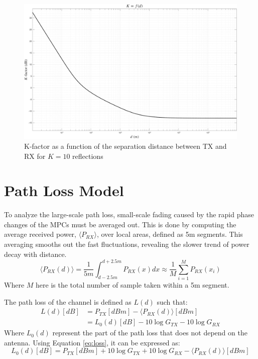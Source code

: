 \begin{figure}
	\centering
	\includegraphics[width=\linewidth]{content/4-images/k-factor}
	\caption{K-factor as a function of the separation distance between TX and RX for $K=10$ reflections}
	\label{fig:k-factor}
\end{figure}

\section{Path Loss Model}
To analyze the large-scale path loss, small-scale fading caused by the rapid phase changes of the MPCs must be averaged out. This is done by computing the average received power, $\langle P_{RX} \rangle$, over local areas, defined as 5m segments. This averaging smooths out the fast fluctuations, revealing the slower trend of power decay with distance.
\begin{equation}
	\langle P_{RX}(d) \rangle = \frac{1}{5m} \int_{d-2.5m}^{d+2.5m} P_{RX}(x) dx \approx \frac{1}{M} \sum_{i=1}^{M} P_{RX}(x_i)
\end{equation}
Where $M$ here is the total number of sample taken within a 5m segment.

The path loss of the channel is defined as $L(d)$ such that:
\begin{align}
	\label{eq:loss}
	L(d) [dB] &= P_{TX} [dBm] - \langle P_{RX}(d) \rangle [dBm]\\
			  &= L_0(d) [dB] - 10 \log G_{TX} - 10 \log G_{RX}
\end{align}
Where $L_0(d)$ represent the part of the path loss that does not depend on the antenna. Using Equation \eqref{eq:loss}, it can be expressed as:
\begin{equation}
	L_0(d) [dB] =  P_{TX} [dBm] + 10 \log G_{TX} + 10 \log G_{RX} - \langle P_{RX}(d) \rangle [dBm]
	\label{eq:loss-2}
\end{equation}

